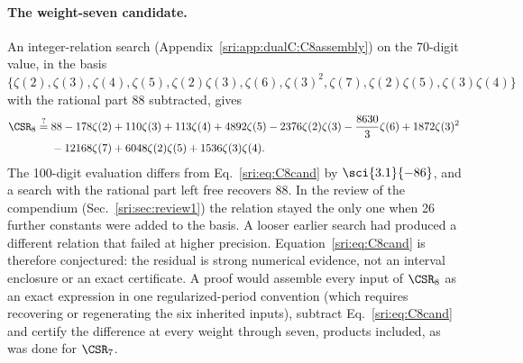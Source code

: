 \paragraph{The weight-seven candidate.} An integer-relation search (Appendix~\ref{sri:app:dualC:C8assembly}) on the
70-digit value, in the basis
$\{\zeta(2),\zeta(3),\zeta(4),\zeta(5),\zeta(2)\zeta(3),\zeta(6),\zeta(3)^2,\zeta(7),\zeta(2)\zeta(5),\zeta(3)\zeta(4)\}$
with the rational part 88 subtracted, gives
\begin{equation}
\begin{aligned}
 \CSR_8\overset{?}{=}{}&88-178\zeta(2)+110\zeta(3)+113\zeta(4)+4892\zeta(5)-2376\zeta(2)\zeta(3)-\frac{8630}{3}\zeta(6)
 +1872\zeta(3)^2\\
 &-12168\zeta(7)+6048\zeta(2)\zeta(5)+1536\zeta(3)\zeta(4).
\end{aligned}
\label{sri:eq:C8cand}
\end{equation}
The 100-digit evaluation differs from Eq.~\eqref{sri:eq:C8cand} by $\sci{3.1}{-86}$, and a search with the rational
part left free recovers 88. In the review of the compendium (Sec.~\ref{sri:sec:review1}) the relation stayed the only
one when 26 further constants were added to the basis. A looser earlier search had produced a different relation
that failed at higher precision. Equation~\eqref{sri:eq:C8cand} is therefore conjectured: the residual is strong
numerical evidence, not an interval enclosure or an exact certificate. A proof would assemble every input of
$\CSR_8$ as an exact expression in one regularized-period convention (which requires recovering or regenerating the
six inherited inputs), subtract Eq.~\eqref{sri:eq:C8cand} and certify the difference at every weight through seven,
products included, as was done for $\CSR_7$.

